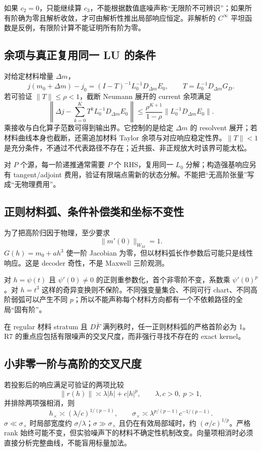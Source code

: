 如果 $c_2=0$，只能继续算 $c_3$，不能根据数值底噪声称“无限阶不可辨识”；如果所有阶确为零且解析收敛，才可由解析性推出局部响应恒定。非解析的 $C^\infty$ 平坦函数是反例，有限阶计算不能证明所有阶为零。

\subsection{余项与真正复用同一 LU 的条件}
对给定材料增量 $\Delta m$，
\[
j(m_0+\Delta m)-j_0
=(I-T)^{-1}L_0^{-1}D_{\Delta m}E_0,
\qquad T=L_0^{-1}D_{\Delta m}G_D.
\]
若可验证 $\|T\|\le\rho<1$，截断 Neumann 展开的 current 余项满足
\[
\left\|
\Delta j-\sum_{k=0}^{K}T^kL_0^{-1}D_{\Delta m}E_0
\right\|
\le
\frac{\rho^{K+1}}{1-\rho}
\|L_0^{-1}D_{\Delta m}E_0\|.
\]
乘接收与白化算子范数可得到输出界。它控制的是给定 $\Delta m$ 的 resolvent 展开；若材料曲线本身也截断，还需追加材料 Taylor 余项与对应响应稳定性界。$\|T\|<1$ 是充分条件，不通过不代表路径不存在；近共振、非正规放大时该界可能太松。

对 $P$ 个源，每一阶递推通常需要 $P$ 个 RHS，复用同一 $L_0$ 分解；构造强基响应另有 tangent/adjoint 费用，验证有限端点需新的状态分解。不能把“无高阶张量”写成“无物理费用”。

\subsection{正则材料弧、条件补偿类和坐标不变性}
为了把高阶归因于物理，至少要求
\[
\|m'(0)\|_{W_M}=1.
\]
$G(h)=m_0+ah^3$ 使一阶 Jacobian 为零，但以材料弧长作参数后可能只是线性响应。这是 decoder 奇性，不是 Maxwell 三阶观测。

对 $h=\psi(t)$ 且 $\psi'(0)\ne0$ 的正则重参数化，首个非零阶不变，系数乘 $\psi'(0)^p$。对 $h=t^3$ 这样的奇异变换则不保阶。不同强变量集合、不同可行 chart、不同高阶弱弧可以产生不同 $p$；所以不能声称每个材料方向都有一个不依赖路径的全局“固有阶”。

在 regular 材料 stratum 且 $D\bar F$ 满列秩时，任一正则材料弧的严格首阶必为 1。R7 的重点应包括有限噪声的交叉尺度，而非强行寻找不存在的 exact kernel。

\subsection{小非零一阶与高阶的交叉尺度}
若投影后的响应满足可验证的两项比较
\[
\|r(h)\|\asymp \lambda|h|+c|h|^p,\qquad
\lambda,c>0,\ p>1,
\]
并排除两项强相消，则
\[
h_\times\asymp(\lambda/c)^{1/(p-1)},\qquad
\sigma_\times\asymp
\lambda^{p/(p-1)}c^{-1/(p-1)}.
\]
$\sigma\ll\sigma_\times$ 时局部宽度约 $\sigma/\lambda$；$\sigma\gg\sigma_\times$ 且仍在有效局部域时，约 $(\sigma/c)^{1/p}$。严格 rank 始终可能不变，但实验噪声下的材料不确定性机制改变。向量项相消时必须直接分析完整曲线，不能盲用标量加法。


